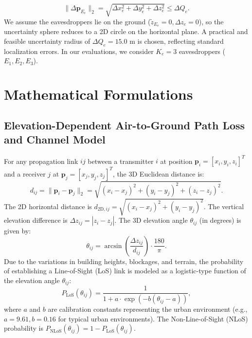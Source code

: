 \documentclass[journal,onecolumn]{IEEEtran}
\begin{document}
\begin{itemize}
    \begin{equation}
        \|\Delta\mathbf{p}_{E_e}\|_2 = \sqrt{\Delta x_e^2 + \Delta y_e^2 + \Delta z_e^2} \le \Delta Q_e.
    \end{equation}
    We assume the eavesdroppers lie on the ground ($\tilde{z}_{E_e} = 0, \Delta z_e = 0$), so the uncertainty sphere reduces to a 2D circle on the horizontal plane. A practical and feasible uncertainty radius of $\Delta Q_e = 15.0\text{ m}$ is chosen, reflecting standard localization errors. In our evaluations, we consider $K_e = 3$ eavesdroppers ($E_1, E_2, E_3$).
\end{itemize}

\section{Mathematical Formulations}

\subsection{Elevation-Dependent Air-to-Ground Path Loss and Channel Model}
For any propagation link $ij$ between a transmitter $i$ at position $\mathbf{p}_i = [x_i, y_i, z_i]^T$ and a receiver $j$ at $\mathbf{p}_j = [x_j, y_j, z_j]^T$, the 3D Euclidean distance is:
\begin{equation}
    d_{ij} = \|\mathbf{p}_i - \mathbf{p}_j\|_2 = \sqrt{(x_i - x_j)^2 + (y_i - y_j)^2 + (z_i - z_j)^2}.
\end{equation}
The 2D horizontal distance is $d_{\text{2D}, ij} = \sqrt{(x_i - x_j)^2 + (y_i - y_j)^2}$. The vertical elevation difference is $\Delta z_{ij} = |z_i - z_j|$. The 3D elevation angle $\theta_{ij}$ (in degrees) is given by:
\begin{equation}
    \theta_{ij} = \arcsin\left( \frac{\Delta z_{ij}}{d_{ij}} \right) \cdot \frac{180}{\pi}.
\end{equation}
Due to the variations in building heights, blockages, and terrain, the probability of establishing a Line-of-Sight (LoS) link is modeled as a logistic-type function of the elevation angle $\theta_{ij}$:
\begin{equation}
    P_{\text{LoS}}(\theta_{ij}) = \frac{1}{1 + a \cdot \exp\left( -b (\theta_{ij} - a) \right)},
\end{equation}
where $a$ and $b$ are calibration constants representing the urban environment (e.g., $a = 9.61, b = 0.16$ for typical urban environments). The Non-Line-of-Sight (NLoS) probability is $P_{\text{NLoS}}(\theta_{ij}) = 1 - P_{\text{LoS}}(\theta_{ij})$.
\end{document}
